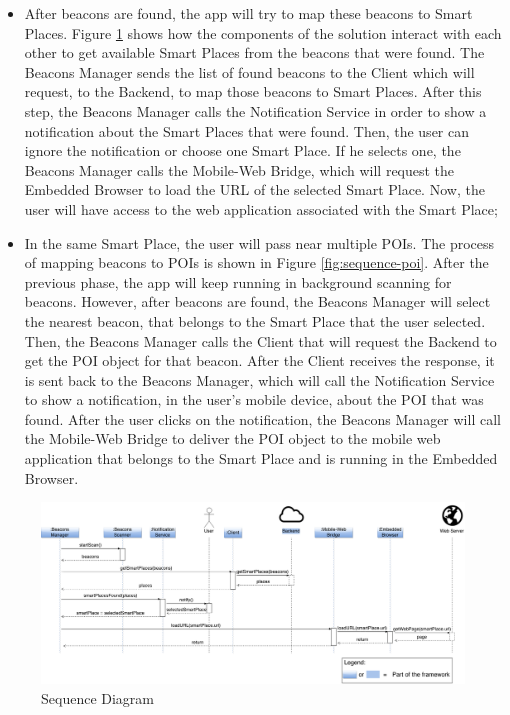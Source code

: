 \begin{itemize}
\item After beacons are found, the app will try to map
these beacons to Smart Places. Figure
\ref{fig:sequence-smart-places} shows how the components
of the solution interact with each other to get
available Smart Places from the beacons that were found.
The Beacons Manager sends the list of found beacons
to the Client which will request, to the Backend,
to map those beacons to Smart Places.
After this step, the Beacons Manager calls the
Notification Service in order to show a notification
about the Smart Places that were found.
Then, the user can ignore the notification or
choose one Smart Place. If he selects one,
the Beacons Manager calls the Mobile-Web Bridge,
which will request the Embedded Browser to load
the URL of the selected Smart Place. Now, the user
will have access to the web application associated
with the Smart Place;
\item In the same Smart Place, the user will
pass near multiple POIs. The process of mapping
beacons to POIs is shown in Figure
\ref{fig:sequence-poi}.
After the previous
phase, the app will keep running in background
scanning for beacons. However, after beacons
are found, the Beacons Manager will select the
nearest beacon, that belongs to the Smart Place
that the user selected. Then, the Beacons
Manager calls the Client that will request
the Backend to get the POI object for that
beacon. After the Client receives the response,
it is sent back to the Beacons Manager, which will
call the Notification Service to show a notification,
in the user's mobile device, about the POI that was
found. After the user clicks on the notification,
the Beacons Manager will call the Mobile-Web
Bridge to deliver the POI object to the mobile
web application that belongs to the Smart Place
and is running in the Embedded Browser.
\end{itemize}

\begin{figure}[!ht]
  \centering
    \includegraphics[width=1\textwidth]{img/smart-places-sequence}
    \caption{Sequence Diagram}
    \label{fig:sequence-smart-places}
\end{figure}

